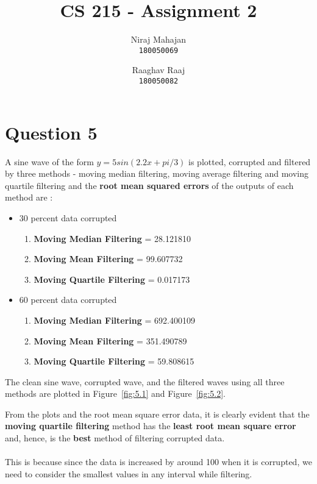 \documentclass[12pt]{article}
\author{
Niraj Mahajan \\
\texttt{180050069} \and
Raaghav Raaj \\
\texttt{180050082}}
\title{CS 215 - Assignment 2}
\begin{document}
\maketitle

\newpage
\section{Question 5}
A sine wave of the form $y=5sin(2.2x + pi/3)$ is plotted, corrupted and filtered by three methods - moving median filtering, moving average filtering and moving quartile filtering and the \textbf{root mean squared errors} of the outputs of each method are : 
\begin{itemize}
\item 30 percent data corrupted
	\begin{enumerate}
	\item \textbf{Moving Median Filtering} = 28.121810
	\item \textbf{Moving Mean Filtering} = 99.607732
	\item \textbf{Moving Quartile Filtering} = 0.017173
	\end{enumerate}
\item 60 percent data corrupted
	\begin{enumerate}
	\item \textbf{Moving Median Filtering} = 692.400109
	\item \textbf{Moving Mean Filtering} = 351.490789
	\item \textbf{Moving Quartile Filtering} = 59.808615
	\end{enumerate}
\end{itemize}
The clean sine wave, corrupted wave, and the filtered waves using all three methods are plotted in Figure~\ref{fig:5.1} and Figure~\ref{fig:5.2}.

\newpage
From the plots and the root mean square error data, it is clearly evident that the \textbf{moving quartile filtering} method has the \textbf{least root mean square error} and, hence, is the \textbf{best} method of filtering corrupted data.
\\ \\
This is because since the data is increased by around 100 when it is corrupted, we need to consider the smallest values in any interval while filtering. 
\end{document}
